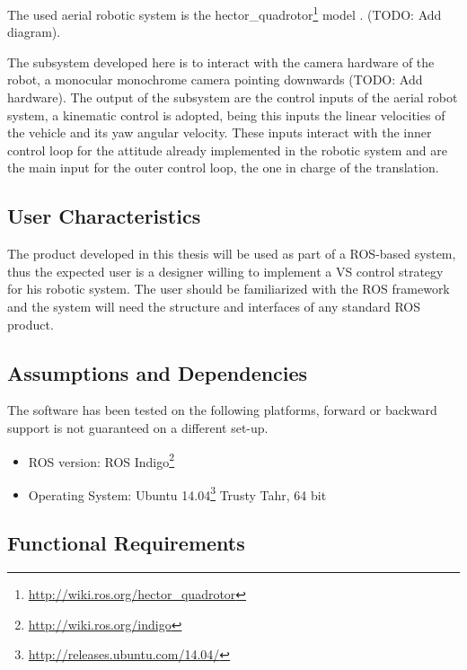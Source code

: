 The used aerial robotic system is the hector\_quadrotor\footnote{\url{http://wiki.ros.org/hector_quadrotor}} model \cite{2012simpar_meyer}. (TODO: Add diagram).

The subsystem developed here is to interact with the camera hardware of the robot, a monocular monochrome camera pointing downwards (TODO: Add hardware). The output of the subsystem are the control inputs of the aerial robot system, a kinematic control is adopted, being this inputs the linear velocities of the vehicle and its yaw angular velocity. These inputs interact with the inner control loop for the attitude already implemented in the robotic system and are the main input for the outer control loop, the one in charge of the translation.

\subsection{User Characteristics}
\label{sec:user-characteristics}

The product developed in this thesis will be used as part of a ROS-based system, thus the expected user is a designer willing to implement a VS control strategy for his robotic system. The user should be familiarized with the ROS framework and the system will need the structure and interfaces of any standard ROS product.

\subsection{Assumptions and Dependencies}
\label{sec:assumptions-dependencies}

The software  has been tested on the following platforms, forward or backward support is not guaranteed on a different set-up.

\begin{itemize}
	\item ROS version: ROS Indigo\footnote{\url{http://wiki.ros.org/indigo}}
	\item Operating System: Ubuntu 14.04\footnote{\url{http://releases.ubuntu.com/14.04/}} Trusty Tahr, 64 bit
\end{itemize}

\subsection{Functional Requirements}
\label{sec:functional-requirements}

